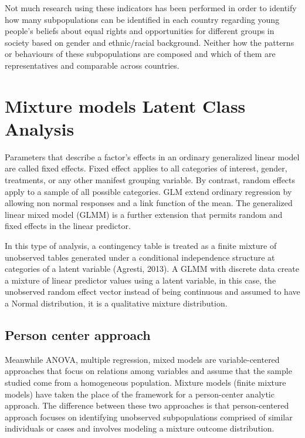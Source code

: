 \documentclass[12pt,a4paper,oneside]{reedthesis}
\begin{document}
Not much research using these indicators has been performed in order to identify how many subpopulations can be identified in each country regarding young people's beliefs about equal rights and opportunities for different groups in society based on gender and ethnic/racial background. Neither how the patterns or behaviours of these subpopulations are composed and which of them are representatives and comparable across countries.

\hypertarget{mixture-models-latent-class-analysis}{%
\section{Mixture models Latent Class Analysis}\label{mixture-models-latent-class-analysis}}

Parameters that describe a factor's effects in an ordinary generalized linear model are called fixed effects. Fixed effect applies to all categories of interest, gender, treatments, or any other manifest grouping variable. By contrast, random effects apply to a sample of all possible categories. GLM extend ordinary regression by allowing non normal responses and a link function of the mean. The generalized linear mixed model (GLMM) is a further extension that permits random and fixed effects in the linear predictor.

In this type of analysis, a contingency table is treated as a finite mixture of unobserved tables generated under a conditional independence structure at categories of a latent variable (Agresti, 2013).
A GLMM with discrete data create a mixture of linear predictor values using a latent variable, in this case, the unobserved random effect vector instead of being continuous and assumed to have a Normal distribution, it is a qualitative mixture distribution.

\hypertarget{person-center-approach}{%
\subsection{Person center approach}\label{person-center-approach}}

Meanwhile ANOVA, multiple regression, mixed models are variable-centered approaches that focus on relations among variables and assume that the sample studied come from a homogeneous population. Mixture models (finite mixture models) have taken the place of the framework for a person-center analytic approach. The difference between these two approaches is that person-centered approach focuses on identifying unobserved subpopulations comprised of similar individuals or cases and involves modeling a mixture outcome distribution.
\end{document}
